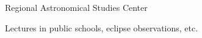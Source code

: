 \entryItem
	{Regional Astronomical Studies Center}
	{}

	\begin{items}
		\item Lectures in public schools, eclipse observations, etc.
	\end{items}